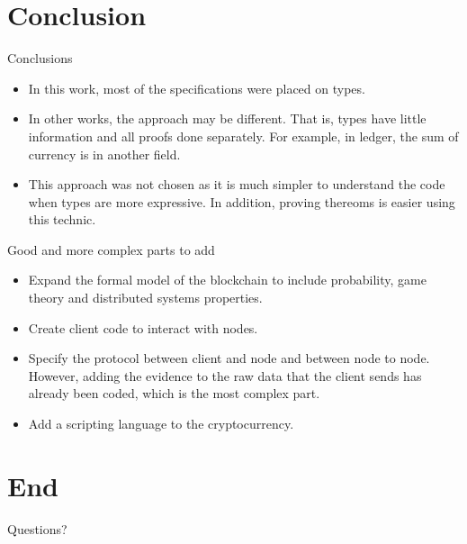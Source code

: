 \documentclass{beamer}
\begin{document}
\section{Conclusion}

\begin{frame}{Conclusions}
  \begin{itemize}[<+->]
    \item In this work, most of the specifications were placed on types.
    \item In other works, the approach may be different.
      That is, types have little information and all proofs done separately.
      For example, in ledger, the sum of currency is in another field.
    \item This approach was not chosen as it is much simpler to understand the code when types are more expressive.
      In addition, proving thereoms is easier using this technic.
  \end{itemize}
\end{frame}

\begin{frame}{Good and more complex parts to add}
  \begin{itemize}[<+->]
    \item Expand the formal model of the blockchain to include
      probability, game theory and distributed systems properties.
    \item Create client code to interact with nodes.
    \item Specify the protocol between client and node and between node to node.
          However, adding the evidence to the raw data that the client sends has already been coded,
          which is the most complex part.
    \item Add a scripting language to the cryptocurrency.
  \end{itemize}
\end{frame}

\section{End}

\begin{frame}
  \vspace*{36 pt}
  \begin{center}
  {\Huge Questions?}
  \end{center}
\end{frame}

%   
%   
\end{document}
